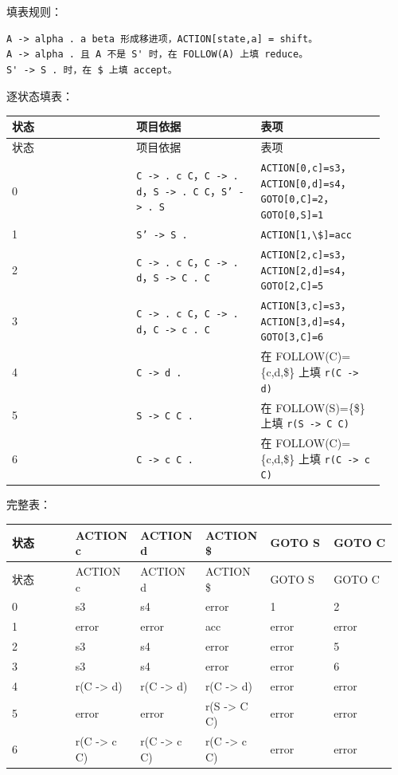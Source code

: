 \documentclass[UTF8]{ctexart}
\begin{document}
填表规则：

\begin{Verbatim}[fontsize=\small,breaklines=true]
A -> alpha . a beta 形成移进项，ACTION[state,a] = shift。
A -> alpha . 且 A 不是 S' 时，在 FOLLOW(A) 上填 reduce。
S' -> S . 时，在 $ 上填 accept。
\end{Verbatim}

逐状态填表：

\begin{longtable}{|p{0.31\linewidth}|p{0.31\linewidth}|p{0.31\linewidth}|}
\hline
状态 & 项目依据 & 表项 \\
\hline
\endfirsthead
状态 & 项目依据 & 表项 \\
\hline
\endhead
0 & \texttt{C -> . c C}，\texttt{C -> . d}，\texttt{S -> . C C}，\texttt{S' -> . S} & \texttt{ACTION[0,c]=s3}，\texttt{ACTION[0,d]=s4}，\texttt{GOTO[0,C]=2}，\texttt{GOTO[0,S]=1} \\
\hline
1 & \texttt{S' -> S .} & \texttt{ACTION[1,\textbackslash{}\$]=acc} \\
\hline
2 & \texttt{C -> . c C}，\texttt{C -> . d}，\texttt{S -> C . C} & \texttt{ACTION[2,c]=s3}，\texttt{ACTION[2,d]=s4}，\texttt{GOTO[2,C]=5} \\
\hline
3 & \texttt{C -> . c C}，\texttt{C -> . d}，\texttt{C -> c . C} & \texttt{ACTION[3,c]=s3}，\texttt{ACTION[3,d]=s4}，\texttt{GOTO[3,C]=6} \\
\hline
4 & \texttt{C -> d .} & 在 FOLLOW(C)=\{c,d,\$\} 上填 \texttt{r(C -> d)} \\
\hline
5 & \texttt{S -> C C .} & 在 FOLLOW(S)=\{\$\} 上填 \texttt{r(S -> C C)} \\
\hline
6 & \texttt{C -> c C .} & 在 FOLLOW(C)=\{c,d,\$\} 上填 \texttt{r(C -> c C)} \\
\hline
\end{longtable}

完整表：

\begin{longtable}{|p{0.16\linewidth}|p{0.16\linewidth}|p{0.16\linewidth}|p{0.16\linewidth}|p{0.16\linewidth}|p{0.16\linewidth}|}
\hline
状态 & ACTION c & ACTION d & ACTION \$ & GOTO S & GOTO C \\
\hline
\endfirsthead
状态 & ACTION c & ACTION d & ACTION \$ & GOTO S & GOTO C \\
\hline
\endhead
0 & s3 & s4 & error & 1 & 2 \\
\hline
1 & error & error & acc & error & error \\
\hline
2 & s3 & s4 & error & error & 5 \\
\hline
3 & s3 & s4 & error & error & 6 \\
\hline
4 & r(C -> d) & r(C -> d) & r(C -> d) & error & error \\
\hline
5 & error & error & r(S -> C C) & error & error \\
\hline
6 & r(C -> c C) & r(C -> c C) & r(C -> c C) & error & error \\
\hline
\end{longtable}
\end{document}
